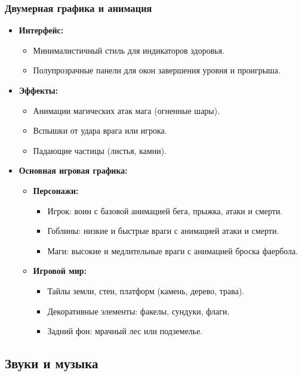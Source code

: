 \documentclass{article}
\begin{document}
\subsubsection{Двумерная графика и анимация}
\begin{itemize}
    \item \textbf{Интерфейс:}
    \begin{itemize}
        \item Минималистичный стиль для индикаторов здоровья.
        \item Полупрозрачные панели для окон завершения уровня и проигрыша.
    \end{itemize}
    \item \textbf{Эффекты:}
    \begin{itemize}
        \item Анимации магических атак мага (огненные шары).
        \item Вспышки от удара врага или игрока.
        \item Падающие частицы (листья, камни).
    \end{itemize}
    \item \textbf{Основная игровая графика:}
    \begin{itemize}
        \item \textbf{Персонажи:}
        \begin{itemize}
            \item Игрок: воин с базовой анимацией бега, прыжка, атаки и смерти.
            \item Гоблины: низкие и быстрые враги с анимацией атаки и смерти.
            \item Маги: высокие и медлительные враги с анимацией броска фаербола.
        \end{itemize}
        \item \textbf{Игровой мир:}
        \begin{itemize}
            \item Тайлы земли, стен, платформ (камень, дерево, трава).
            \item Декоративные элементы: факелы, сундуки, флаги.
            \item Задний фон: мрачный лес или подземелье.
        \end{itemize}
    \end{itemize}
\end{itemize}

\subsection{Звуки и музыка}
\end{document}
